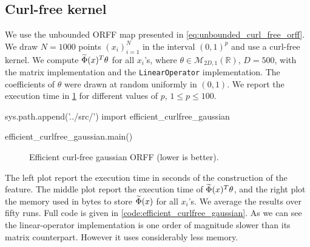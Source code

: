 \subsection{Curl-free kernel}
We use the unbounded \acs{ORFF} map presented in \cref{eq:unbounded_curl_free_orff}. We draw $N=1000$ points $(x_i)_{i=1}^N$ in the interval $(0,1)^{p}$ and use a curl-free kernel. We compute $\widetilde{\Phi}(x)^T\theta$ for all $x_i$'s, where $\theta\in\mathcal{M}_{2D,1}(\mathbb{R})$, $D=500$, with the matrix implementation and the \texttt{LinearOperator} implementation. The coefficients of $\theta$ were drawn at random uniformly in $(0,1)$. We report the execution time in \cref{fig:efficient_curlfree_gaussian} for different values of $p$, $1\le p\le100$.
\begin{pycode}
sys.path.append('../src/')
import efficient_curlfree_gaussian

efficient_curlfree_gaussian.main()
\end{pycode}
\begin{figure}[htb]
\caption[Efficient curl-free gaussian \acs{ORFF}]{Efficient curl-free gaussian ORFF (lower is better).}
\label{fig:efficient_curlfree_gaussian}
\end{figure}
The left plot report the execution time in seconds of the construction of the feature. The middle plot report the execution time of $\widetilde{\Phi}(x)^T\theta$, and the right plot the memory used in bytes  to store $\widetilde{\Phi}(x)$ for all $x_i$'s. We average the results over fifty runs. Full code is given in \cref{code:efficient_curlfree_gaussian}. As we can see the linear-operator implementation is one order of magnitude slower than its matrix counterpart. However it uses considerably less memory.



